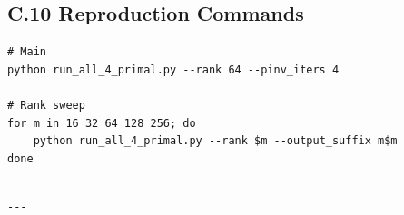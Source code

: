 \subsection{C.10 Reproduction Commands}

\begin{lstlisting}
# Main
python run_all_4_primal.py --rank 64 --pinv_iters 4

# Rank sweep
for m in 16 32 64 128 256; do
    python run_all_4_primal.py --rank $m --output_suffix m$m
done
\end{lstlisting}
\begin{lstlisting}

---
\end{lstlisting}